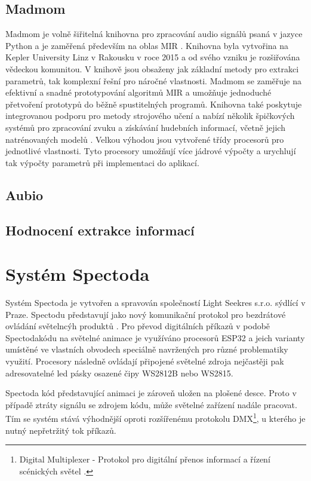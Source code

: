 \subsection{Madmom}
Madmom je volně šiřitelná knihovna pro zpracování audio signálů psaná v jazyce Python a je zaměřená především na oblas \acs{MIR} \cite{madmom}. Knihovna byla vytvořina na Kepler University Linz v Rakousku v roce 2015 a od svého vzniku je rozšiřována vědeckou komunitou. V knihově jsou obsaženy jak základní metody pro extrakci parametrů, tak komplexní řešní pro náročné vlastnosti. Madmom se zaměřuje na efektivní a snadné prototypování algoritmů MIR a umožňuje jednoduché přetvoření prototypů do běžně spustitelných programů. Knihovna také poskytuje integrovanou podporu pro metody strojového učení a nabízí několik špičkových systémů pro zpracování zvuku a získávání hudebních informací, včetně jejich natrénovaných modelů \cite{madmom_paper}. Velkou výhodou jsou vytvořené třídy procesorů pro jednotlivé vlastnosti. Tyto procesory umožňují více jádrové výpočty a urychlují tak výpočty parametrů při implementaci do aplikací. 

\subsection{Aubio}


\subsection{Hodnocení extrakce informací} \label{sec:Mir_eval}


\section{Systém Spectoda} \label{sec:Spectoda}
Systém Spectoda je vytvořen a spravován společností Light Seekres s.r.o. sýdlící v Praze. Spectodu představují jako nový komunikační protokol pro bezdrátové ovládání světelncýh produktů \cite{Spectoda}. Pro převod digitálních příkazů v podobě Spectodakódu na světelné animace je využíváno procesorů ESP32 a jeich varianty umístěné ve vlastních obvodech speciálně navržených pro různé problematiky využití. Procesory následně ovládají připojené světelné zdroja nejčastěji pak adresovatelné led pásky osazené čipy WS2812B nebo WS2815.

Spectoda kód představující animaci je zároveň uložen na plošené desce. Proto v případě ztráty signálu se zdrojem kódu, může světelné zařízení nadále pracovat. Tím se systém stává výhodnější oproti rozšířenému protokolu DMX\footnote{Digital Multiplexer - Protokol pro digitální přenos informací a řízení scénických světel \cite{DMX}.}, u kterého je nutný nepřetržitý tok příkazů. 

